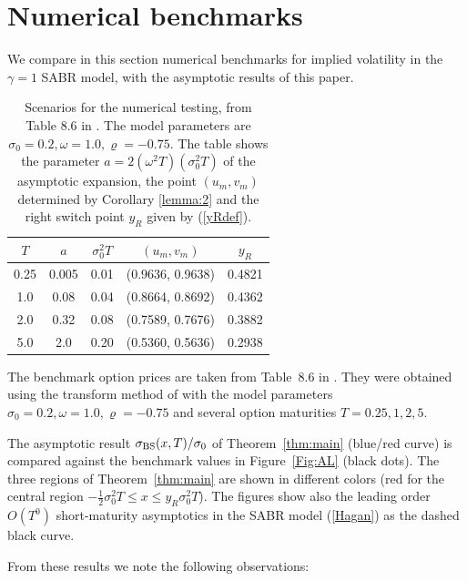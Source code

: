 \documentclass[11pt]{article}
\numberwithin{equation}{section}
\theoremstyle{plain}
\begin{document}
\section{Numerical benchmarks}
\label{sec:7}

We compare in this section numerical benchmarks for implied volatility in the
$\gamma=1$ SABR model, with the asymptotic results of this paper. 


\begin{table}
\caption{\label{Tab:corr} 
Scenarios for the numerical testing, from Table 8.6 in \cite{Lewis2017}.
The model parameters are $\sigma_0=0.2,\omega=1.0, \varrho=-0.75$.
The table shows the parameter $a=2(\omega^2 T)(\sigma_0^2T)$ 
of the asymptotic expansion, the point $(u_m,v_m)$ determined by Corollary
\ref{lemma:2} and the right switch point $y_R$ given by (\ref{yRdef}).}
\begin{center}
\begin{tabular}{|c|c|c|c|c|}
\hline
$T$ & $a$ & $\sigma_0^2 T$ & $(u_m,v_m)$ & $y_R$ \\
\hline \hline
0.25 & 0.005 & 0.01 & (0.9636, 0.9638) & 0.4821 \\
1.0  & 0.08  & 0.04 & (0.8664, 0.8692) & 0.4362 \\
2.0  & 0.32  & 0.08 & (0.7589, 0.7676) & 0.3882 \\
5.0  & 2.0   & 0.20 & (0.5360, 0.5636) & 0.2938 \\
\hline 
\end{tabular}
\end{center}
\end{table}


The benchmark option prices are taken from Table~8.6 in \cite{Lewis2017}.
They were obtained using the transform method of
\cite{Lewis,Lewis2017} with the model parameters $\sigma_0=0.2,\omega=1.0,
\varrho=-0.75$ and several option maturities $T=0.25,1,2,5$. 

The asymptotic result $\sigma_{\rm BS}(x,T)/\sigma_0$ of Theorem~\ref{thm:main}
(blue/red curve) is compared against the benchmark values in 
Figure~\ref{Fig:AL} (black dots). The three regions of Theorem~\ref{thm:main}
are shown in different colors (red for the central region $-\frac12\sigma_0^2 T
\leq x \leq y_R \sigma_0^2 T$).
The figures show also the leading order $O(T^0)$ short-maturity 
asymptotics in the SABR model (\ref{Hagan}) as the dashed black curve.

From these results we note the following observations:
\end{document}
